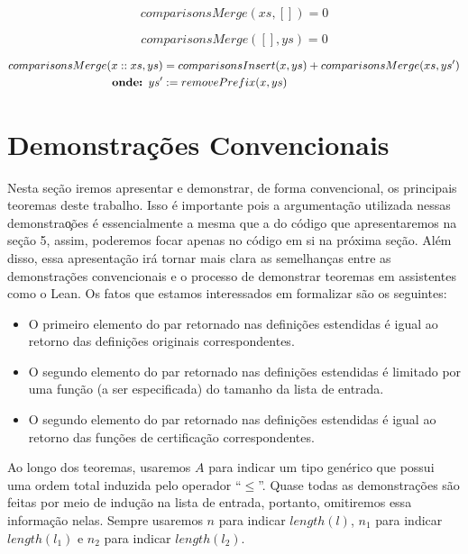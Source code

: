 \documentclass[12pt, oneside, a4paper,english,brazil]{abntex2}
\begin{document}
\begin{equation} \label{comp_merge_base_1}
  comparisonsMerge(xs, []) = 0
\end{equation}

\begin{equation} \label{comp_merge_base_2}
  comparisonsMerge([], ys) = 0
\end{equation}

\begin{equation} \label{comp_merge_ind}
  \begin{split}
  comparisonsMerge(x :: xs, ys) &= comparisonsInsert(x, ys) + comparisonsMerge(xs, ys')\\
  \text{\textbf{onde: }} ys' &:= removePrefix(x, ys)
  \end{split}
\end{equation}

\chapter{Demonstra\c{c}\~oes Convencionais}

Nesta se\c{c}\~ao iremos apresentar e demonstrar, de forma convencional,
os principais teoremas deste trabalho. Isso \'e importante pois a
argumenta\c{c}\~ao utilizada nessas demonstra\c{o}\~oes \'e essencialmente a
mesma que a do c\'odigo que apresentaremos na se\c{c}\~ao 5, assim, poderemos
focar apenas no c\'odigo em si na pr\'oxima se\c{c}\~ao. Al\'em disso, essa
apresenta\c{c}\~ao ir\'a tornar mais clara as semelhan\c{c}as entre as
demonstra\c{c}\~oes convencionais e o processo de demonstrar teoremas em
assistentes como o Lean. Os fatos que
estamos interessados em formalizar s\~ao os seguintes:
\begin{itemize}
  \item O primeiro elemento do par retornado nas defini\c{c}\~oes estendidas \'e igual ao retorno das defini\c{c}\~oes originais correspondentes.
  \item O segundo elemento do par retornado nas defini\c{c}\~oes estendidas \'e limitado por uma fun\c{c}\~ao (a ser especificada) do tamanho da lista de entrada.
  \item O segundo elemento do par retornado nas defini\c{c}\~oes estendidas \'e igual ao retorno das fun\c{c}\~oes de certifica\c{c}\~ao correspondentes.
\end{itemize}

\qquad Ao longo dos teoremas, usaremos $A$ para indicar um tipo gen\'erico que possui uma ordem total induzida pelo
operador ``$\le$''. Quase todas as demonstra\c{c}\~oes s\~ao feitas por meio de indu\c{c}\~ao na lista de entrada,
portanto, omitiremos essa informa\c{c}\~ao nelas. Sempre usaremos $n$ para indicar $length(l)$, $n_{1}$ para indicar
$length(l_{1})$ e $n_{2}$ para indicar $length(l_{2})$.
\end{document}
